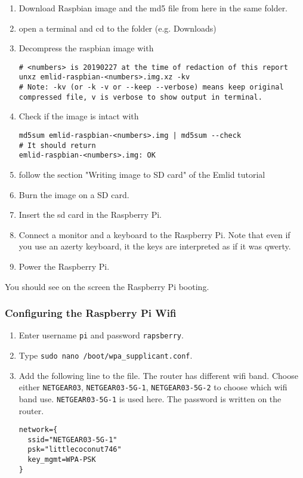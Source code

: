 \begin{enumerate}
    \item Download Raspbian image and the md5 file from here \cite{emlid_rpi_config} in the same folder.
    \item open a terminal and cd to the folder (e.g. Downloads)
    \item Decompress the raspbian image with

          \begin{verbatim}
# <numbers> is 20190227 at the time of redaction of this report
unxz emlid-raspbian-<numbers>.img.xz -kv
# Note: -kv (or -k -v or --keep --verbose) means keep original compressed file, v is verbose to show output in terminal.
                    \end{verbatim}

    \item Check if the image is intact with

          \begin{verbatim}
md5sum emlid-raspbian-<numbers>.img | md5sum --check
# It should return
emlid-raspbian-<numbers>.img: OK
                    \end{verbatim}

    \item follow the section "Writing image to SD card" of the Emlid tutorial
    \item Burn the image on a SD card.
    \item Insert the sd card in the Raspberry Pi.
    \item Connect a monitor and a keyboard to the Raspberry Pi. Note that even if you use an azerty keyboard, it the keys are interpreted as if it was qwerty.
    \item Power the Raspberry Pi.
\end{enumerate}
You should see on the screen the Raspberry Pi booting.

\subsubsection{Configuring the Raspberry Pi Wifi}

\begin{enumerate}
    \item Enter username \texttt{pi} and password \texttt{rapsberry}.
    \item Type \texttt{sudo nano /boot/wpa\_supplicant.conf}.
    \item Add the following line to the file. The router has different wifi band. Choose either \texttt{NETGEAR03}, \texttt{NETGEAR03-5G-1}, \texttt{NETGEAR03-5G-2} to choose which wifi band use. \texttt{NETGEAR03-5G-1} is used here. The password is written on the router.

          \begin{verbatim}
network={
  ssid="NETGEAR03-5G-1"
  psk="littlecoconut746"
  key_mgmt=WPA-PSK
}
                    \end{verbatim}
\end{enumerate}

